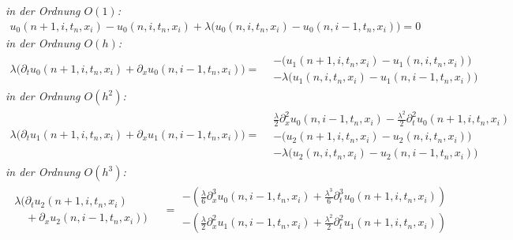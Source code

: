 \vspace{0.4cm}
\noindent \emph{in der Ordnung $O(1)$:}
\begin{align}\label{eq:transport:diskret:o1}
u_0(n+1, i, t_n, x_i) - u_0(n, i, t_n, x_i)
+ \lambda \bigl(u_0(n, i, t_n, x_i) - u_0(n, i-1, t_n, x_i) \bigr) = 0
\end{align}
\vspace{0.4cm}
\noindent \emph{in der Ordnung $O(h)$:}
\begin{align}\label{eq:transport:diskret:oh}
\lambda \bigl( \partial_t u_0(n+1, i, t_n, x_i) + \partial_x u_0(n, i-1, t_n, x_i) \bigr) =
\begin{split}
&- \bigl( u_1(n+1, i, t_n, x_i) - u_1(n, i, t_n, x_i) \bigr)\\
&- \lambda \bigl(u_1(n, i, t_n, x_i) - u_1(n, i-1, t_n, x_i) \bigr)
\end{split}
\end{align}
\vspace{0.4cm}
\noindent \emph{in der Ordnung $O(h^2)$:}
\begin{align}\label{eq:transport:diskret:oh2}
\lambda \bigl( \partial_t u_1(n+1, i, t_n, x_i) + \partial_x u_1(n, i-1, t_n, x_i) \bigr) =
\begin{split}
&\frac {\lambda}{2} \partial^2_x u_0(n, i-1, t_n, x_i) - \frac{\lambda^2}{2} \partial^2_t u_0(n+1, i, t_n, x_i)\\
&- \bigl( u_2(n+1, i, t_n, x_i) - u_2(n, i, t_n, x_i) \bigr)\\
&- \lambda \bigl(u_2(n, i, t_n, x_i) - u_2(n, i-1, t_n, x_i) \bigr)
\end{split}
\end{align}
\vspace{0.4cm}
\noindent \emph{in der Ordnung $O(h^3)$:}
\begin{align}\label{eq:transport:diskret:oh3}
\begin{split}
\lambda \bigl(\partial_t u_2(n+1, i, t_n, x_i)\qquad\\
\quad + \partial_x u_2(n, i-1, t_n, x_i) \bigr)
\end{split}
&= \begin{split}
- \left(\frac {\lambda}{6} \partial^3_x u_0(n, i-1, t_n, x_i) + \frac{\lambda^3}{6} \partial^3_t u_0(n+1, i, t_n, x_i)\right)\\
- \left(\frac {\lambda}{2} \partial^2_x u_1(n, i-1, t_n, x_i) + \frac{\lambda^2}{2} \partial^2_t u_1(n+1, i, t_n, x_i)\right)
\end{split}
\end{align}

